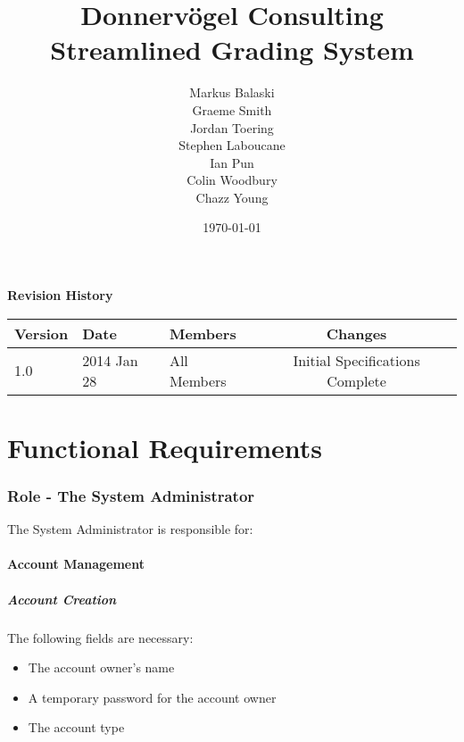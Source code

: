 \documentclass{article}
\begin{document}
\title{Donnervögel Consulting \\ Streamlined Grading System}
\author{Markus Balaski \\ Graeme Smith \\ Jordan Toering \\ Stephen Laboucane \\ Ian Pun \\ Colin Woodbury \\ Chazz Young}
\date{\today}
\maketitle
\clearpage

\textbf{Revision History}\\
\begin{center}
  \begin{tabular}{l l l | c}
    Version & Date & Members & Changes\\
    \hline
    1.0 & 2014 Jan 28 & All Members & Initial Specifications Complete
  \end{tabular}
\end{center}
\clearpage

\tableofcontents
\clearpage

\part{Functional Requirements}

\section{Role - The System Administrator}
The System Administrator is responsible for:
\subsection{Account Management}
\subsubsection{Account Creation}
The following fields are necessary:
\begin{itemize}
  \item The account owner's name
  \item A temporary password for the account owner
  \item The account type
\end{itemize}
\end{document}

